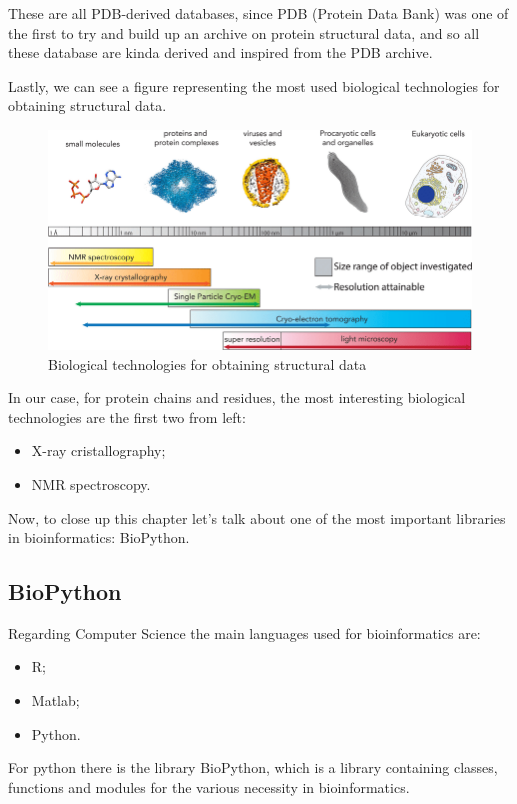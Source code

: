 These are all PDB-derived databases, since PDB (Protein Data Bank) was one of the first to try and build up an archive on protein structural data, and so all these database are kinda derived and inspired from the PDB archive.

Lastly, we can see a figure representing the most used biological technologies for obtaining structural data.

\begin{figure}[h!]
    \centering
    \includegraphics[scale=0.6]{res/proteins_overview/methods_structural.png}
    \caption{Biological technologies for obtaining structural data}
\end{figure}

In our case, for protein chains and residues, the most interesting biological technologies are the first two from left:
\begin{itemize}
    \item X-ray cristallography;
    \item NMR spectroscopy.
\end{itemize}

Now, to close up this chapter let's talk about one of the most important libraries in bioinformatics: BioPython.
\subsection{BioPython}
Regarding Computer Science the main languages used for bioinformatics are:
\begin{itemize}
    \item R;
    \item Matlab;
    \item Python.
\end{itemize}
For python there is the library BioPython, which is a library containing classes, functions and modules for the various necessity in bioinformatics.

